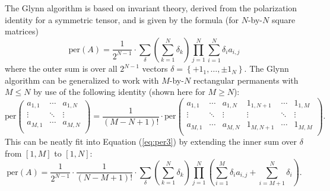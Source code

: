 \documentclass{article}
\begin{document}
The Glynn algorithm is based on invariant theory, derived from the polarization identity for
a symmetric tensor, and is given by the formula (for $N$-by-$N$ square matrices)
\begin{equation} \label{eq:per3}
    \text{per}(A) = \frac{1}{2^{N-1}} \cdot \sum_{\delta}{
        \left(\sum_{k=1}^N{\delta_k}\right)
        \prod_{j=1}^N{\sum_{i=1}^N{\delta_i a_{i,j}}}
    }
\end{equation}
where the outer sum is over all $2^{N-1}$ vectors $\delta = \left\{{+} 1_1,\dots,\pm 1_N\right\}$.
The Glynn algorithm can be generalized to work with $M$-by-$N$ rectangular permanents with $M \leq
N$ by use of the following identity (shown here for $M \geq N$):
\begin{equation} \label{eq:padidentity}
    {\text{per}}\left(
        \begin{matrix}
            a_{1,1} & \cdots & a_{1,N} \\
            \vdots & \ddots & \vdots \\
            a_{M,1} & \cdots & a_{M,N} \\
        \end{matrix}
    \right)
    = \frac{1}{\left(M - N + 1\right)!} \cdot {\text{per}}\left(
        \begin{matrix}
            a_{1,1} & \cdots & a_{1,N} & 1_{1,N+1} & \cdots & 1_{1,M} \\
            \vdots & \ddots & \vdots & \vdots & \ddots & \vdots \\
            a_{M,1} & \cdots & a_{M,N} & 1_{M,N+1} & \cdots & 1_{M,M} \\
        \end{matrix}
    \right).
\end{equation}
This can be neatly fit into Equation (\ref{eq:per3}) by extending the inner sum over $\delta$ from
$\left[1,M\right]$ to $\left[1,N\right]$:
\begin{equation} \label{eq:rectper3}
    \text{per}(A) = \frac{1}{2^{N-1}} \cdot \frac{1}{\left(N - M + 1\right)!} \cdot \sum_{\delta}{
        \left(\sum_{k=1}^N{\delta_k}\right)
        \prod_{j=1}^N{\left(\sum_{i=1}^M{\delta_i a_{i,j}} + \sum_{i=M+1}^N{\delta_i}\right)}
    }.
\end{equation}
\end{document}
